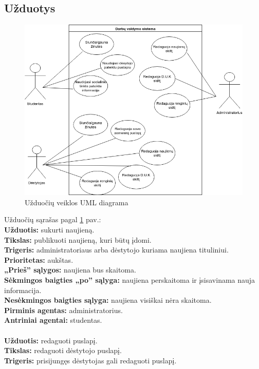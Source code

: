 \documentclass{VUMIFPSkursinis}
\begin{document}
\subsection{Užduotys}
\begin{figure}[H]
\centering
\includegraphics[width=\linewidth]{img/DVS.png}
\caption{Užduočių veiklos UML diagrama}
\label{fig:dvs}
\end{figure}
Užduočių sąrašas pagal \ref{fig:dvs} pav.:\\
\textbf{Užduotis:} sukurti naujieną. \\
\textbf{Tikslas:} publikuoti naujieną, kuri būtų įdomi.\\
\textbf{Trigeris:} administratoriaus arba dėstytojo kuriama naujiena tituliniui. \\
\textbf{Prioritetas:} aukštas. \\
\textbf{„Prieš” sąlygos:} naujiena bus skaitoma.\\
\textbf{Sėkmingos baigties „po” sąlyga:} naujiena perskaitoma ir įsisavinama nauja informacija. \\
\textbf{Nesėkmingos baigties sąlyga:} naujiena visiškai nėra skaitoma. \\
\textbf{Pirminis agentas:} administratorius. \\
\textbf{Antriniai agentai:} studentas. \\
\\
\textbf{Užduotis:} redaguoti puslapį. \\
\textbf{Tikslas:} redaguoti dėstytojo puslapį.\\
\textbf{Trigeris:} prisijungęs dėstytojas gali redaguoti puslapį. \\
\end{document}
